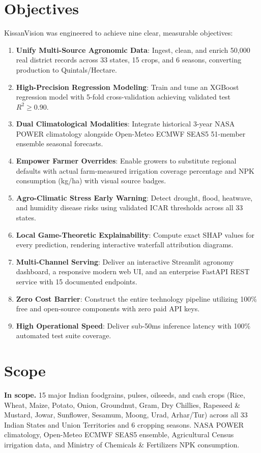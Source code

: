 \documentclass[11pt,a4paper]{report}
\begin{document}
\section{Objectives}
KissanVision was engineered to achieve nine clear, measurable objectives:
\begin{enumerate}
  \item \textbf{Unify Multi-Source Agronomic Data}: Ingest, clean, and enrich 50,000 real district records across 33 states, 15 crops, and 6 seasons, converting production to Quintals/Hectare.
  \item \textbf{High-Precision Regression Modeling}: Train and tune an XGBoost regression model with 5-fold cross-validation achieving validated test $R^2 \ge 0.90$.
  \item \textbf{Dual Climatological Modalities}: Integrate historical 3-year NASA POWER climatology alongside Open-Meteo ECMWF SEAS5 51-member ensemble seasonal forecasts.
  \item \textbf{Empower Farmer Overrides}: Enable growers to substitute regional defaults with actual farm-measured irrigation coverage percentage and NPK consumption (kg/ha) with visual source badges.
  \item \textbf{Agro-Climatic Stress Early Warning}: Detect drought, flood, heatwave, and humidity disease risks using validated ICAR thresholds across all 33 states.
  \item \textbf{Local Game-Theoretic Explainability}: Compute exact SHAP values for every prediction, rendering interactive waterfall attribution diagrams.
  \item \textbf{Multi-Channel Serving}: Deliver an interactive Streamlit agronomy dashboard, a responsive modern web UI, and an enterprise FastAPI REST service with 15 documented endpoints.
  \item \textbf{Zero Cost Barrier}: Construct the entire technology pipeline utilizing 100\% free and open-source components with zero paid API keys.
  \item \textbf{High Operational Speed}: Deliver sub-50ms inference latency with 100\% automated test suite coverage.
\end{enumerate}

\section{Scope}
\textbf{In scope.} 15 major Indian foodgrains, pulses, oilseeds, and cash crops (Rice, Wheat, Maize, Potato, Onion, Groundnut, Gram, Dry Chillies, Rapeseed \& Mustard, Jowar, Sunflower, Sesamum, Moong, Urad, Arhar/Tur) across all 33 Indian States and Union Territories and 6 cropping seasons. NASA POWER climatology, Open-Meteo ECMWF SEAS5 ensemble, Agricultural Census irrigation data, and Ministry of Chemicals \& Fertilizers NPK consumption.
\end{document}
